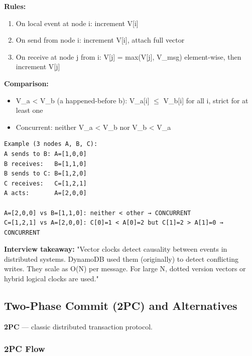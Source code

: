 \documentclass[11pt]{article}
\providecommand{\tightlist}{\setlength{\itemsep}{1pt}\setlength{\parskip}{0pt}}
\begin{document}
\textbf{Rules:}

\begin{enumerate}
\def\labelenumi{\arabic{enumi}.}
\tightlist
\item
  On local event at node i: increment V{[}i{]}
\item
  On send from node i: increment V{[}i{]}, attach full vector
\item
  On receive at node j from i: V{[}j{]} = max(V{[}j{]}, V\_msg) element-wise, then increment V{[}j{]}
\end{enumerate}

\textbf{Comparison:}

\begin{itemize}
\tightlist
\item
  V\_a \textless{} V\_b (a happened-before b): V\_a{[}i{]} \(\leq\) V\_b{[}i{]} for all i, strict for at least one
\item
  Concurrent: neither V\_a \textless{} V\_b nor V\_b \textless{} V\_a
\end{itemize}

\setcodelang{}

\begin{verbatim}
Example (3 nodes A, B, C):
A sends to B: A=[1,0,0]
B receives:   B=[1,1,0]
B sends to C: B=[1,2,0]
C receives:   C=[1,2,1]
A acts:       A=[2,0,0]

A=[2,0,0] vs B=[1,1,0]: neither < other → CONCURRENT
C=[1,2,1] vs A=[2,0,0]: C[0]=1 < A[0]=2 but C[1]=2 > A[1]=0 → CONCURRENT
\end{verbatim}

\textbf{Interview takeaway:} "Vector clocks detect causality between events in distributed systems. DynamoDB used them (originally) to detect conflicting writes. They scale as O(N) per message. For large N, dotted version vectors or hybrid logical clocks are used."

\subsection{Two-Phase Commit (2PC) and Alternatives}\label{two-phase-commit-2pc-and-alternatives}

\textbf{2PC} --- classic distributed transaction protocol.

\subsubsection{2PC Flow}\label{2pc-flow}

\end{document}
